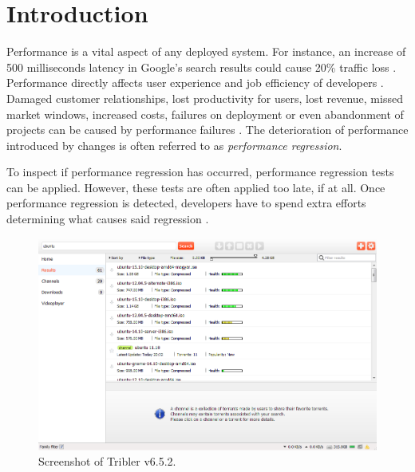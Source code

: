 \chapter{Introduction}
\label{chp:introduction}





% 

Performance is a vital aspect of any deployed system.
For instance, an increase of 500 milliseconds latency in Google's search results could cause 20\% traffic loss \cite{mayer2009search}. 
Performance directly affects user experience and job efficiency of developers \cite{huang2014performance}.
Damaged customer relationships, lost productivity for users, lost revenue, missed market windows, increased costs, failures on deployment or even abandonment of projects can be caused by performance failures \cite{woodside2007future, williams1998performance}.
The deterioration of performance introduced by changes is often referred to as \emph{performance regression}.

To inspect if performance regression has occurred, performance regression tests can be applied.
However, these tests are often applied too late, if at all.
Once performance regression is detected, developers have to spend extra efforts determining what causes said regression \cite{huang2014performance}.

\begin{figure}[!h]
	\centering
	\includegraphics[width=\linewidth]{introduction/images/tribler_screenshot.png}
	\caption{Screenshot of Tribler v6.5.2.}
	\label{fig:tribler_screenshot}
\end{figure}


